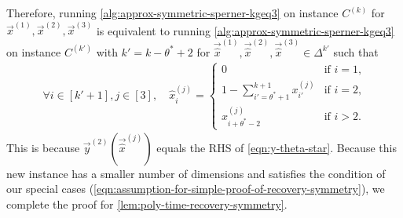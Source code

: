 Therefore, running \cref{alg:approx-symmetric-sperner-kgeq3} on instance $C^{(k)}$ for $\vec{x}^{(1)},\vec{x}^{(2)}, \vec{x}^{(3)}$ is equivalent to running \cref{alg:approx-symmetric-sperner-kgeq3} on instance $C^{(k')}$ with $k'=k-\theta^*+2$ for $\vec{\hat{x}}^{(1)},\vec{\hat{x}}^{(2)},\vec{\hat{x}}^{(3)}\in \Delta^{k'}$ such that
\begin{align*}
    \forall i\in [k'+1], j\in [3], \quad \hat{x}_i^{(j)} = \begin{cases}
        0 & \text{if $i=1$,}\\
        1-\sum_{i'=\theta^*+1}^{k+1} x^{(j)}_{i'} & \text{if $i=2$,}\\
        x^{(j)}_{i+\theta^*-2} & \text{if $i>2$.}
    \end{cases}
\end{align*}
This is because $\vec{y}^{(2)}(\vec{\hat{x}}^{(j)})$ equals the RHS of \cref{eqn:y-theta-star}.
Because this new instance has a smaller number of dimensions and satisfies the condition of our special cases (\cref{eqn:assumption-for-simple-proof-of-recovery-symmetry}), we complete the proof for \cref{lem:poly-time-recovery-symmetry}.